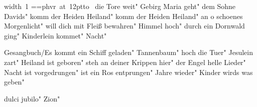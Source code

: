 \ifx\mxversion\undefined
  
  
  
  
\fi

%
\newbox\datebox%
\hbox{\pdfximage width 1\pdfrefximage\pdflastximage}
\setbox\datebox=\hbox{\font\datefont=phvr at 12pt\datefont{}\hbox to }%
\ht\datebox=0pt%
\box\datebox%
\vfill\eject
\tableofcontents
\normalmusicsize
 die Tore weit"
 Gebirg Maria geht"
 dem Sohne Davids"
 komm der Heiden Heiland"
 komm der Heiden Heiland"
 an o schoenes Morgenlicht"
 will dich mit Fleiß bewahren"
 Himmel hoch"
 durch ein Dornwald ging"
 Kinderlein kommet"
 Nacht"

 Gesangbuch/Es kommt ein Schiff geladen"
 Tannenbaum"
 hoch die Tuer"
 Jesulein zart"
 Heiland ist geboren"
 steh an deiner Krippen hier"
 der Engel helle Lieder"
 Nacht ist vorgedrungen"
 ist ein Ros entprungen"
 Jahre wieder"
 Kinder wirds was geben"

\makeatletter
{}
\makeatother
 dulci jubilo"
\makeatletter
{}
\makeatother
 Zion"
\bookbye